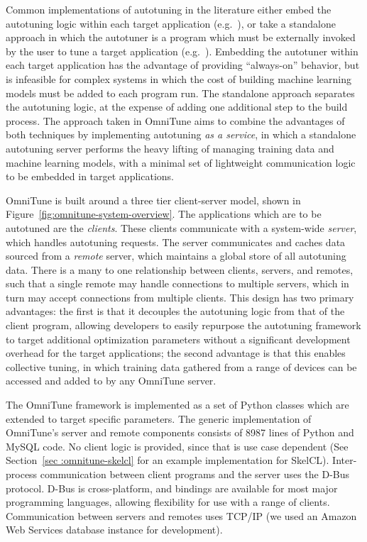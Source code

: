\documentclass[nonatbib,preprint,nocopyrightspace,9pt]{sigplanconf}
\begin{document}
Common implementations of autotuning in the literature either embed the
autotuning logic within each target application (e.g.~\cite{Chen2014}), or take
a standalone approach in which the autotuner is a program which must be
externally invoked by the user to tune a target application
(e.g.~\cite{Lutz2013}). Embedding the autotuner within each target application
has the advantage of providing ``always-on'' behavior, but is infeasible for
complex systems in which the cost of building machine learning models must be
added to each program run. The standalone approach separates the autotuning
logic, at the expense of adding one additional step to the build process. The
approach taken in OmniTune aims to combine the advantages of both techniques by
implementing autotuning \emph{as a service}, in which a standalone autotuning
server performs the heavy lifting of managing training data and machine learning
models, with a minimal set of lightweight communication logic to be embedded in
target applications.

OmniTune is built around a three tier client-server model, shown in
Figure~\ref{fig:omnitune-system-overview}. The applications which are to be
autotuned are the \emph{clients}. These clients communicate with a system-wide
\emph{server}, which handles autotuning requests. The server communicates and
caches data sourced from a \emph{remote} server, which maintains a global store
of all autotuning data. There is a many to one relationship between clients,
servers, and remotes, such that a single remote may handle connections to
multiple servers, which in turn may accept connections from multiple clients.
This design has two primary advantages: the first is that it decouples the
autotuning logic from that of the client program, allowing developers to easily
repurpose the autotuning framework to target additional optimization parameters
without a significant development overhead for the target applications; the
second advantage is that this enables collective tuning, in which training data
gathered from a range of devices can be accessed and added to by any OmniTune
server.

The OmniTune framework is implemented as a set of Python classes which are
extended to target specific parameters. The generic implementation of OmniTune's
server and remote components consists of 8987 lines of Python and MySQL code. No
client logic is provided, since that is use case dependent (See Section~\ref{sec
:omnitune-skelcl} for an example implementation for SkelCL). Inter-process
communication between client programs and the server uses the D-Bus protocol.
D-Bus is cross-platform, and bindings are available for most major programming
languages, allowing flexibility for use with a range of clients. Communication
between servers and remotes uses TCP/IP (we used an Amazon Web Services database
instance for development).
\end{document}
